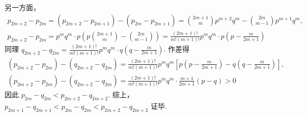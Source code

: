 \documentclass[UTF8,a4paper,oneside,11pt]{ctexbook}
\begin{document}
\begin{solution}
\begin{enumerate}
另一方面，
\[
\begin{gathered}
p_{2m+2}-p_{2m}=(p_{2m+2}-p_{2m+1})-(p_{2m}-p_{2m+1})=\binom{2m+1}{m}p^{m+2}q^m-\binom{2m}{m-1}p^{m+1}q^m,\\
p_{2m+2}-p_{2m}=p^mq^m\cdot p\left(p\binom{2m+1}{m}-\binom{2m}{m-1}\right)=\frac{(2m+1)!}{m!(m+1)!}p^mq^m\cdot p\left(p-\frac{m}{2m+1}\right)
\end{gathered}
\]
同理
\(q_{2m+2}-q_{2m} =\frac{(2m+1)!}{m!(m+1)!}p^mq^m\cdot q\left(q-\frac{m}{2m+1}\right)\).
作差得
\[
\begin{gathered}
(p_{2m+2}-p_{2m})-(q_{2m+2}-q_{2m})=\frac{(2m+1)!}{m!(m+1)!}p^mq^m\left[p\left(p-\frac{m}{2m+1}\right)-q\left(q-\frac{m}{2m+1}\right)\right],\\
(p_{2m+2}-p_{2m})-(q_{2m+2}-q_{2m})=\frac{(2m+1)!}{m!(m+1)!}p^mq^m\cdot \frac{m+1}{2m+1}(p-q)>0
\end{gathered}
\]
因此
\(p_{2m}-q_{2m}<p_{2m+2}-q_{2m+2}\).
综上，
\(
p_{2m+1}-q_{2m+1}<p_{2m}-q_{2m}<p_{2m+2}-q_{2m+2}
\)
证毕.
\end{enumerate}
\end{solution}

\end{document}
